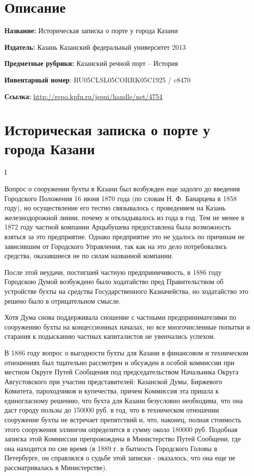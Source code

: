 \documentclass[oneside,final,14pt]{extreport}
\begin{document}
\section*{Описание}

{\bf Название:} Историческая записка о порте у города Казани

{\bf Издатель:} Казань Казанский федеральный университет 2013

{\bf Предметные рубрики:} Казанский речной порт -- История

{\bf Инвентарный номер}: RU05CLSL05CORRK05C1925 / c8470

{\bf Ссылка:} \hyperref[http://repo.kpfu.ru/jspui/handle/net/4754]{http://repo.kpfu.ru/jspui/handle/net/4754}


\section*{Историческая записка о порте у города Казани}


\begin{center}
	I
\end{center}

Вопрос о сооружении бухты в Казани был возбужден еще задолго до введения Городского Положения 16 июня 1870 года (по словам Н. Ф. Банарцева в 1858 году), но осуществление его тестно связывалось с проведением на Казань железнодорожной линии, почему и откладывалось из года в год. Тем не менее в 1872 году частной компании Арцыбушева предоставлена была возможность взяться за это предприятие. Однако предприятие это не удалось по причинам не зависившим от Городского Управления, так как на это дело потребовались средства, оказавшиеся не по силам названной компании.

После этой неудачи, постигшей частную предприимчивость, в 1886 году Городскою Думой возбуждено было ходатайство пред Правительством об устройстве бухты на средства Государственного Казначейства, но ходатайство это решено было в отрицательном смысле.

Хотя Дума снова поддерживала сношение с частными предпринимателями по сооружению бухты на концессионных началах, но все многочисленные попытки и старания к подысканию частных капиталистов не увенчались успехом.

В 1886 году вопрос о выгодности бухты для Казани в финансовом и техническом отношениях был тщательно рассмотрен и обсужден в особой коммиссии при местном Округе Путей Сообщения под председательством Начальника Округа Августовского при участии представителей: Казанской Думы, Биржевого Комитета, пароходчиков и купечества, причем Коммиссия эта пришла к единогласному решению, что бухта для Казани безусловно необходима, что она даст городу пользы до 150000 руб. в год, что в техническом отношении сооружение бухты не встречает препятствий и, что, наконец,  полная стоимость этого сооружения эллингом определится в сумму около 180000 руб. Подобная записка этой Коммиссии препровождена в Министерство Путей Сообщени, где она находится по сие время (в 1889 г. в бытность Городского Головы в Петербурге, он справлялся о судьбе этой записки - оказалось, что она еще не рассматривалась в Министерстве). 
\end{document}
